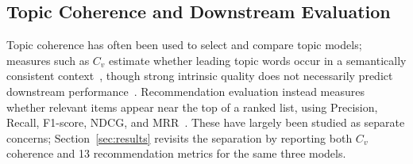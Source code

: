 \subsection{Topic Coherence and Downstream Evaluation}
Topic coherence has often been used to select and compare topic models; measures such as $C_v$ estimate whether leading topic words occur in a semantically consistent context~\cite{roder2015exploring,mimno2011optimizing}, though strong intrinsic quality does not necessarily predict downstream performance~\cite{rudiger2022topic}. Recommendation evaluation instead measures whether relevant items appear near the top of a ranked list, using Precision, Recall, F1-score, NDCG, and MRR~\cite{valcarce2020assessing}. These have largely been studied as separate concerns; Section~\ref{sec:results} revisits the separation by reporting both $C_v$ coherence and 13 recommendation metrics for the same three models.
